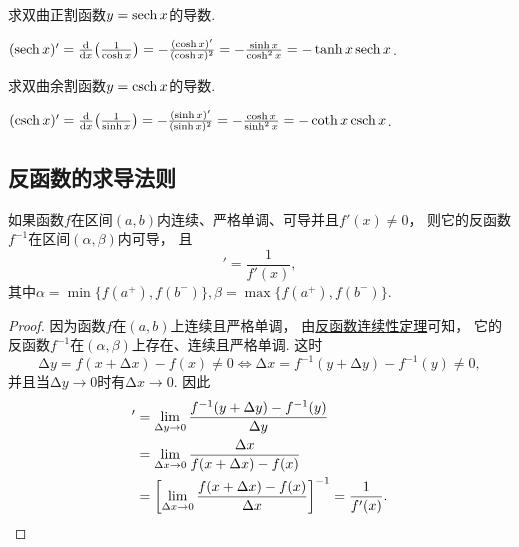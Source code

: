 \begin{example}%
求双曲正割函数\(y = \sech x\)的导数.
\begin{solution}
\((\sech x)'
= \dv{x}(\frac1{\cosh x})
= -\frac{(\cosh x)'}{(\cosh x)^2}
= -\frac{\sinh x}{\cosh^2 x}
= -\tanh x \sech x\).
\end{solution}
\end{example}

\begin{example}%
求双曲余割函数\(y = \csch x\)的导数.
\begin{solution}
\((\csch x)'
= \dv{x}(\frac1{\sinh x})
= -\frac{(\sinh x)'}{(\sinh x)^2}
= -\frac{\cosh x}{\sinh^2 x}
= -\coth x \csch x\).
\end{solution}
\end{example}

\subsection{反函数的求导法则}
\begin{theorem}
如果函数\(f\)在区间\((a,b)\)内连续、严格单调、可导并且\(f'(x)\neq0\)，
则它的反函数\(f^{-1}\)在区间\((\alpha,\beta)\)内可导，
且\begin{equation*}
	[f^{-1}(y)]'=\frac1{f'(x)},
\end{equation*}
其中\(\alpha=\min\{f(a^+),f(b^-)\},
\beta=\max\{f(a^+),f(b^-)\}\).
\begin{proof}
因为函数\(f\)在\((a,b)\)上连续且严格单调，
由\hyperref[theorem:极限.连续函数的极限2]{反函数连续性定理}可知，
它的反函数\(f^{-1}\)在\((\alpha,\beta)\)上存在、连续且严格单调.
这时\begin{equation*}
	\increment y = f(x + \increment x) - f(x) \neq 0
	\iff
	\increment x = f^{-1}(y + \increment y) - f^{-1}(y) \neq 0,
\end{equation*}
并且当\(\increment y \to 0\)时有\(\increment x \to 0\).
因此\begin{align*}
	[f^{-1}(y)]'
	&= \lim_{\increment y \to 0}
		\frac{f^{-1}(y + \increment y) - f^{-1}(y)}{\increment y} \\
	&= \lim_{\increment x \to 0}
		\frac{\increment x}{f(x + \increment x) - f(x)} \\
	&= \left[
		\lim_{\increment x \to 0}
		\frac{f(x + \increment x) - f(x)}{\increment x}
	\right]^{-1}
	= \frac1{f'(x)}.
	\qedhere
\end{align*}
\end{proof}
\end{theorem}

